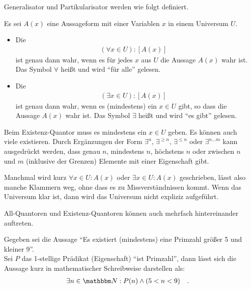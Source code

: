 \begin{Unit}
Generalisator und Partikularisator werden wie folgt definiert.

\begin{Definition}
Es sei $A(x)$ eine Aussageform mit einer Variablen $x$ in einem Universum $U$. 

\begin{itemize}
\item
Die 
\begin{align}
  \left( \forall x \in U \right) : \left[ A(x) \right]
\end{align}
ist genau dann wahr, wenn es für jedes $x$ aus $U$ die Aussage $A(x)$ 
wahr ist. Das Symbol $\forall$ heißt  und wird 
\enquote{für alle} gelesen.
\item
Die 
\begin{align}
  \left( \exists x \in U \right) : \left[ A(x) \right]
\end{align}
ist genau dann wahr, wenn es (mindestens) ein $x \in U$ gibt, so dass die 
Aussage $A(x)$ wahr ist. Das Symbol $\exists$ heißt 
 und wird \enquote{es gibt} gelesen.
\end{itemize}
\end{Definition}

Beim Existenz-Quantor muss es mindestens ein $x \in U$ geben. Es können auch 
viele existieren. Durch Ergänzungen der Form $\exists^n$, $\exists^{\geq n}$, 
$\exists^{\leq n}$ oder $\exists^{n \ldots m}$ kann ausgedrückt werden, dass 
genau $n$, mindestens $n$, höchstens $n$ oder zwischen $n$ und $m$ (inklusive 
der Grenzen) Elemente mit einer Eigenschaft gibt.

Manchmal wird kurz $\forall x \in U: A(x)$ oder $\exists x \in U: A(x)$ 
geschrieben, lässt also manche Klammern weg, ohne dass es zu
Missverständnissen kommt. Wenn das Universum klar ist, dann wird das Universum
nicht expliziz aufgeführt.

All-Quantoren und Existenz-Quantoren können auch mehrfach hintereinander 
auftreten.
\end{Unit}

\begin{Unit}[Beispiel]
Gegeben sei die Aussage \enquote{Es existiert (mindestens) eine Primzahl 
größer 5 und kleiner 9}. \\
Sei $P$ das 1-stellige Prädikat (Eigenschaft) \enquote{ist Primzahl}, dann 
lässt sich die Aussage kurz in mathematischer Schreibweise darstellen als: 
\begin{align*}
  \exists n \in \NN :  P(n) \land (5 < n < 9)  \quad .
\end{align*}
\end{Unit}

